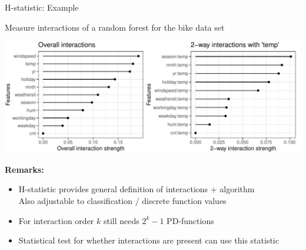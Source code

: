 \documentclass[11pt,compress,t,notes=noshow, aspectratio=169, xcolor=table]{beamer}
\begin{document}
\begin{frame}{H-statistic: Example}

Measure interactions of a random forest for the bike data set

\begin{center}
	\includegraphics[width=\textwidth]{figure/h-statistic}
\end{center}

\pause
\textbf{Remarks:}
\begin{itemize}
    \item H-statistic provides general definition of interactions + algorithm \\
    Also adjustable to classification / discrete function values
    \item For interaction order $k$ still needs $2^k-1$ PD-functions
    \item Statistical test for whether interactions are present can use this statistic
\end{itemize}

\end{frame}

\endlecture
\end{document}
